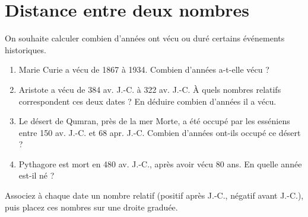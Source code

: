 \documentclass[10pt,a4paper]{article}
\begin{document}
\section{Distance entre deux nombres}

\begin{exo}[][]
    On souhaite calculer combien d'années ont vécu ou duré certains événements historiques.
    \begin{enumerate}
        \item Marie Curie a vécu de 1867 à 1934. Combien d'années a-t-elle vécu ?
        \item Aristote a vécu de 384 av. J.-C. à 322 av. J.-C. À quels nombres relatifs correspondent ces deux dates ? En déduire combien d'années il a vécu.
        \item Le désert de Qumran, près de la mer Morte, a été occupé par les esséniens entre 150 av. J.-C. et 68 apr. J.-C. Combien d'années ont-ils occupé ce désert ?
        \item Pythagore est mort en 480 av. J.-C., après avoir vécu 80 ans. En quelle année est-il né ?
    \end{enumerate}

    \begin{indication}
        Associez à chaque date un nombre relatif (positif après J.-C., négatif avant J.-C.), puis placez ces nombres sur une droite graduée.
    \end{indication}
\end{exo}
\end{document}
